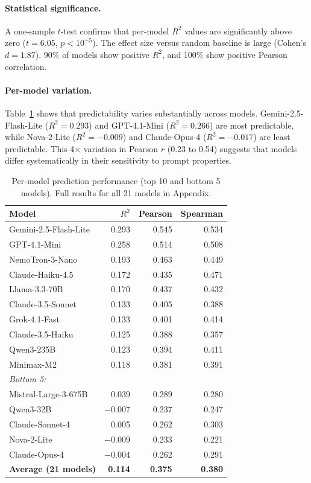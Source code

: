 \documentclass{article}
\begin{document}
\paragraph{Statistical significance.}
A one-sample $t$-test confirms that per-model $R^2$ values are significantly above zero ($t = 6.05$, $p < 10^{-5}$). The effect size versus random baseline is large (Cohen's $d = 1.87$). 90\% of models show positive $R^2$, and 100\% show positive Pearson correlation.

\paragraph{Per-model variation.}
Table~\ref{tab:per_model} shows that predictability varies substantially across models. Gemini-2.5-Flash-Lite ($R^2 = 0.293$) and GPT-4.1-Mini ($R^2 = 0.266$) are most predictable, while Nova-2-Lite ($R^2 = -0.009$) and Claude-Opus-4 ($R^2 = -0.017$) are least predictable. This 4$\times$ variation in Pearson $r$ (0.23 to 0.54) suggests that models differ systematically in their sensitivity to prompt properties.

\begin{table}[t]
\centering
\caption{Per-model prediction performance (top 10 and bottom 5 models). Full results for all 21 models in Appendix.}
\label{tab:per_model}
\small
\begin{tabular}{@{}lrrr@{}}
\toprule
Model & $R^2$ & Pearson & Spearman \\
\midrule
Gemini-2.5-Flash-Lite & 0.293 & 0.545 & 0.534 \\
GPT-4.1-Mini & 0.258 & 0.514 & 0.508 \\
NemoTron-3-Nano & 0.193 & 0.463 & 0.449 \\
Claude-Haiku-4.5 & 0.172 & 0.435 & 0.471 \\
Llama-3.3-70B & 0.170 & 0.437 & 0.432 \\
Claude-3.5-Sonnet & 0.133 & 0.405 & 0.388 \\
Grok-4.1-Fast & 0.133 & 0.401 & 0.414 \\
Claude-3.5-Haiku & 0.125 & 0.388 & 0.357 \\
Qwen3-235B & 0.123 & 0.394 & 0.411 \\
Minimax-M2 & 0.118 & 0.381 & 0.391 \\
\midrule
\emph{Bottom 5:} & & & \\
Mistral-Large-3-675B & 0.039 & 0.289 & 0.280 \\
Qwen3-32B & $-0.007$ & 0.237 & 0.247 \\
Claude-Sonnet-4 & 0.005 & 0.262 & 0.303 \\
Nova-2-Lite & $-0.009$ & 0.233 & 0.221 \\
Claude-Opus-4 & $-0.004$ & 0.262 & 0.291 \\
\midrule
\textbf{Average (21 models)} & \textbf{0.114} & \textbf{0.375} & \textbf{0.380} \\
\bottomrule
\end{tabular}
\end{table}
\end{document}
